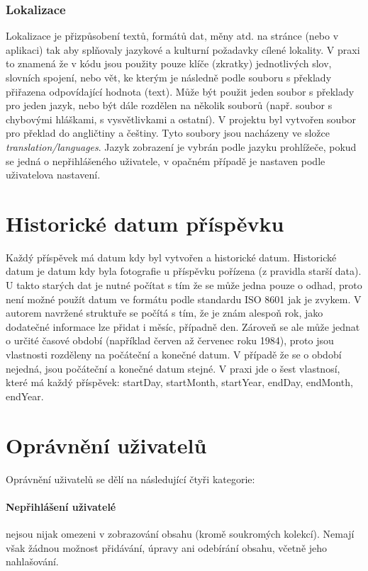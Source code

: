 \documentclass[12pt, a4paper,
 twoside,        %
 openright
]{report}
\begin{document}
\subsubsection{Lokalizace}
Lokalizace je přizpůsobení textů, formátů dat, měny atd. na stránce (nebo v aplikaci) tak aby splňovaly jazykové a kulturní požadavky cílené lokality. V praxi to znamená že v kódu jsou použity pouze klíče (zkratky) jednotlivých slov, slovních spojení, nebo vět, ke kterým je následně podle souboru s překlady přiřazena odpovídající hodnota (text). Může být použit jeden soubor s překlady pro jeden jazyk, nebo být dále rozdělen na několik souborů (např. soubor s chybovými hláškami, s vysvětlivkami a ostatní). V projektu byl vytvořen soubor pro překlad do angličtiny a češtiny. Tyto soubory jsou nacházeny ve složce \textit{translation/languages}. Jazyk zobrazení je vybrán podle jazyku prohlížeče, pokud se jedná o nepřihlášeného uživatele, v opačném případě je nastaven podle uživatelova nastavení. \cite{internationalizationVsLocalization}
\section{Historické datum příspěvku}\label{section:historical_date}
Každý příspěvek má datum kdy byl vytvořen a historické datum. Historické datum je datum kdy byla fotografie u příspěvku pořízena (z pravidla starší data). U takto starých dat je nutné počítat s tím že se může jedna pouze o odhad, proto není možné použít datum ve formátu podle standardu ISO 8601 jak je zvykem. V autorem navržené struktuře se počítá s tím, že je znám alespoň rok, jako dodatečné informace lze přidat i měsíc, případně den. Zároveň se ale může jednat o určité časové období (například červen až červenec roku 1984), proto jsou vlastnosti rozděleny na počáteční a konečné datum. V případě že se o období nejedná, jsou počáteční a konečné datum stejné. V praxi jde o šest vlastnosí, které má každý příspěvek: startDay, startMonth, startYear, endDay, endMonth, endYear.

\section{Oprávnění uživatelů}
Oprávnění uživatelů se dělí na následující čtyři kategorie:
\paragraph{Nepřihlášení uživatelé} nejsou nijak omezeni v zobrazování obsahu (kromě soukromých kolekcí). Nemají však žádnou možnost přidávání, úpravy ani odebírání obsahu, včetně jeho nahlašování.
\end{document}
